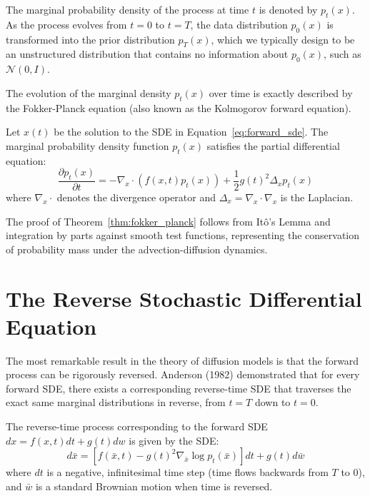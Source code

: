 The marginal probability density of the process at time $t$ is denoted by $p_t(x)$. As the process evolves from $t=0$ to $t=T$, the data distribution $p_0(x)$ is transformed into the prior distribution $p_T(x)$, which we typically design to be an unstructured distribution that contains no information about $p_0(x)$, such as $\mathcal{N}(0, I)$.

The evolution of the marginal density $p_t(x)$ over time is exactly described by the Fokker-Planck equation (also known as the Kolmogorov forward equation).

\begin{theorem}
\label{thm:fokker_planck}
Let $x(t)$ be the solution to the SDE in Equation~\ref{eq:forward_sde}. The marginal probability density function $p_t(x)$ satisfies the partial differential equation:
\begin{equation}
\frac{\partial p_t(x)}{\partial t} = -\nabla_x \cdot (f(x, t) p_t(x)) + \frac{1}{2} g(t)^2 \Delta_x p_t(x)
\end{equation}
where $\nabla_x \cdot$ denotes the divergence operator and $\Delta_x = \nabla_x \cdot \nabla_x$ is the Laplacian.
\end{theorem}
The proof of Theorem~\ref{thm:fokker_planck} follows from It\^{o}'s Lemma and integration by parts against smooth test functions, representing the conservation of probability mass under the advection-diffusion dynamics.


\section{The Reverse Stochastic Differential Equation}

The most remarkable result in the theory of diffusion models is that the forward process can be rigorously reversed. Anderson (1982) demonstrated that for every forward SDE, there exists a corresponding reverse-time SDE that traverses the exact same marginal distributions in reverse, from $t=T$ down to $t=0$.

\begin{theorem}
\label{thm:reverse_sde}
The reverse-time process corresponding to the forward SDE $dx = f(x, t) dt + g(t) dw$ is given by the SDE:
\begin{equation}
\label{eq:reverse_sde}
d\bar{x} = \left[ f(\bar{x}, t) - g(t)^2 \nabla_{\bar{x}} \log p_t(\bar{x}) \right] dt + g(t) d\bar{w}
\end{equation}
where $dt$ is a negative, infinitesimal time step (time flows backwards from $T$ to $0$), and $\bar{w}$ is a standard Brownian motion when time is reversed.
\end{theorem}

